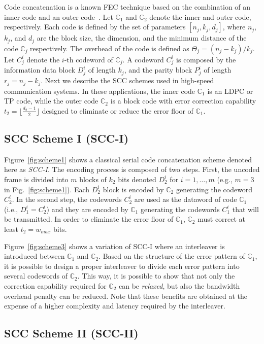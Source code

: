 \documentclass[conference]{IEEEtran}
\newcommand{\C}{\mathbb{C}}  %
\begin{document}
Code concatenation is a known FEC technique based on the combination
of an inner code and an outer
code~\cite{669119,RL2009,forney1966,HP2003}. Let $\C_1$ and $\C_2$
denote the inner and outer code, respectively. Each code is defined by
the set of parameters $[n_j,k_j,d_j]$, where $n_j$, $k_j$, and $d_j$
are the block size, the dimension, and the minimum distance of the
code $\C_j$ respectively. The overhead of the code is defined as
$\Theta_j=(n_j-k_j)/k_j$. Let $C_j^i$ denote the \mbox{$i$-th}
codeword of $\C_j$. A codeword $C_j^i$ is composed by the information
data block $D_j^i$ of length $k_j$, and the parity block $P_j^i$ of
length $r_j=n_j-k_j$. Next we describe the SCC schemes used in
high-speed communication systems. In these applications, the inner
code $\C_1$ is an LDPC or TP code, while the outer code $\C_2$ is a
block code with error correction capability $t_2=\lfloor
\frac{d_2-1}{2} \rfloor$ designed to eliminate or reduce the error
floor of $\C_1$.

\subsection*{SCC Scheme I (SCC-I)} \label{sec:scheme1}
 
Figure~\ref{fig:scheme1} shows a classical serial code concatenation
scheme denoted here as \emph{SCC-I}. The encoding process is composed
of two steps. First, the uncoded frame is divided into $m$ blocks of
$k_2$ bits denoted $D_2^i$ for $i=1,\ldots,m$ (e.g., $m=3$ in
Fig.~\ref{fig:scheme1}). Each $D_2^i$ block is encoded by $\C_2$
generating the codeword $C_2^i$. In the second step, the codewords
$C_2^i$ are used as the dataword of code $\C_1$ (i.e., $D_1^i=C_2^i$)
and they are encoded by $\C_1$ generating the codewords $C_1^i$ that
will be transmitted. In order to eliminate the error floor of $\C_1$,
$\C_2$ must correct at least $t_2=w_{max}$ bits.

Figure~\ref{fig:scheme3} shows a variation of SCC-I where an
interleaver is introduced between $\C_1$ and $\C_2$. Based on the
structure of the error pattern of $\C_1$, it is possible to design a
proper interleaver to divide each error pattern into several codewords
of $\C_2$. This way, it is possible to show that not only the
correction capability required for $\C_2$ can be \emph{relaxed}, but
also the bandwidth overhead penalty can be reduced. Note that these
benefits are obtained at the expense of a higher complexity and
latency required by the interleaver.

\subsection*{SCC Scheme II (SCC-II)} \label{sec:scheme1}
\end{document}
